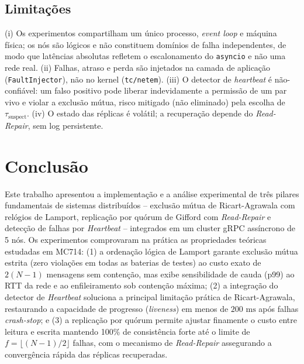 \documentclass[conference,10pt]{IEEEtran}
\begin{document}
\subsection{Limitações}

(i) Os experimentos compartilham um único processo, \textit{event loop} e máquina física; os nós são lógicos e não constituem domínios de falha independentes, de modo que latências absolutas refletem o escalonamento do \texttt{asyncio} e não uma rede real. (ii) Falhas, atraso e perda são injetados na camada de aplicação (\texttt{FaultInjector}), não no kernel (\texttt{tc/netem}). (iii) O detector de \textit{heartbeat} é não-confiável: um falso positivo pode liberar indevidamente a permissão de um par vivo e violar a exclusão mútua, risco mitigado (não eliminado) pela escolha de $\tau_{\text{suspect}}$. (iv) O estado das réplicas é volátil; a recuperação depende do \textit{Read-Repair}, sem log persistente.

\section{Conclusão}

Este trabalho apresentou a implementação e a análise experimental de três pilares fundamentais de sistemas distribuídos -- exclusão mútua de Ricart-Agrawala com relógios de Lamport, replicação por quórum de Gifford com \textit{Read-Repair} e detecção de falhas por \textit{Heartbeat} -- integrados em um cluster gRPC assíncrono de 5 nós. Os experimentos comprovaram na prática as propriedades teóricas estudadas em MC714: (1) a ordenação lógica de Lamport garante exclusão mútua estrita (zero violações em todas as baterias de testes) ao custo exato de $2(N-1)$ mensagens sem contenção, mas exibe sensibilidade de cauda (p99) ao RTT da rede e ao enfileiramento sob contenção máxima; (2) a integração do detector de \textit{Heartbeat} soluciona a principal limitação prática de Ricart-Agrawala, restaurando a capacidade de progresso (\textit{liveness}) em menos de $200\text{ ms}$ após falhas \textit{crash-stop}; e (3) a replicação por quórum permite ajustar finamente o custo entre leitura e escrita mantendo 100\% de consistência forte até o limite de $f = \lfloor(N-1)/2\rfloor$ falhas, com o mecanismo de \textit{Read-Repair} assegurando a convergência rápida das réplicas recuperadas.
\end{document}
